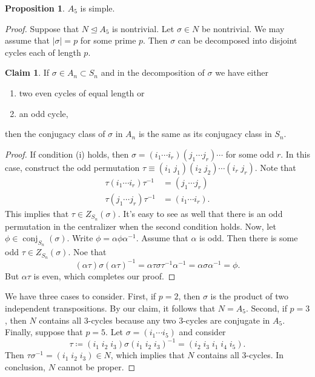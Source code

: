 \documentclass[10pt,letterpaper,cm]{nupset}
\theoremstyle{definition}
\theoremstyle{theorem}
\newtheorem{prop}[definition]{Proposition}
\newtheorem*{claim}{Claim}
\theoremstyle{remark}
\newcommand{\1}{\mathbf{1}}
\newcommand{\0}{\vec 0}
\DeclareMathOperator{\conj}{conj}
\begin{document}
\begin{prop}
$A_5$ is simple.
\end{prop}
\begin{proof}
Suppose that $N \unlhd A_5$ is nontrivial. Let $\sigma \in N$ be nontrivial. We may assume that $\left\lvert{\sigma}\right\rvert =p$ for some prime $p$. Then $\sigma$ can be decomposed into disjoint cycles each of length $p$.
\begin{claim}
If $\sigma \in A_n \subset S_n$ and in the decomposition of $\sigma$ we have either
\begin{enumerate}[label=(\roman*)]
\item two even cycles of equal length or
\item an odd cycle,
\end{enumerate}
then the conjugacy class of $\sigma$ in $A_n$ is the same as its conjugacy class in $S_n$.
\end{claim}
\begin{proof}
If condition (i) holds, then $\sigma = \left(i_1 \cdots i_r\right)\left(j_1 \cdots j_r\right)\cdots$ for some odd $r$. In this case,  construct the odd permutation $\tau \equiv (i_1 \; j_1)(i_2 \; j_2) \cdots (i_r \; j_r)$. Note that 
\begin{align*} 
\tau(i_1 \cdots i_r)\tau^{-1} &  = \left(j_1 \cdots j_r\right)  
\\ \tau (j_1 \cdots j_r) \tau^{-1} & = \left(i_1 \cdots i_r\right).
\end{align*} This implies that $\tau \in Z_{S_n}(\sigma)$. It's easy to see as well that there is an odd permutation in the centralizer when the second condition holds. Now, let $\phi \in \conj_{S_n}(\sigma)$. Write $\phi = \alpha \phi \alpha^{-1}$. Assume that $\alpha$ is odd. Then there is some odd $\tau \in Z_{S_n}(\sigma)$. Noe that $$\left(\alpha \tau\right) \sigma (\alpha \tau)^{-1} = \alpha \tau \sigma \tau^{-1} \alpha^{-1} = \alpha \sigma \alpha^{-1} = \phi.$$ But $\alpha \tau$ is even, which completes our proof.
\end{proof}
We have three cases to consider. First, if $p=2$, then $\sigma$ is the product of two independent transpositions. By our claim, it follows that $N = A_5$. Second, if $p=3$, then $N$ contains all $3$-cycles because any two $3$-cycles are conjugate in $A_5$. Finally, suppose that $p=5$. Let $\sigma = \left(i_1 \cdots i_5\right)$ and consider $$\tau \coloneqq \left(i_1 \; i_2\; i_3\right) \sigma \left(i_1 \; i_2\; i_3\right)^{-1} = \left(i_2 \; i_3 \; i_1 \; i_4 \; i_5\right).$$ Then $\tau \sigma^{-1} = \left(i_1 \; i_2 \; i_3\right) \in N$, which implies that $N$ contains all $3$-cycles. In conclusion, $N$ cannot be proper.  
\end{proof}
\end{document}
